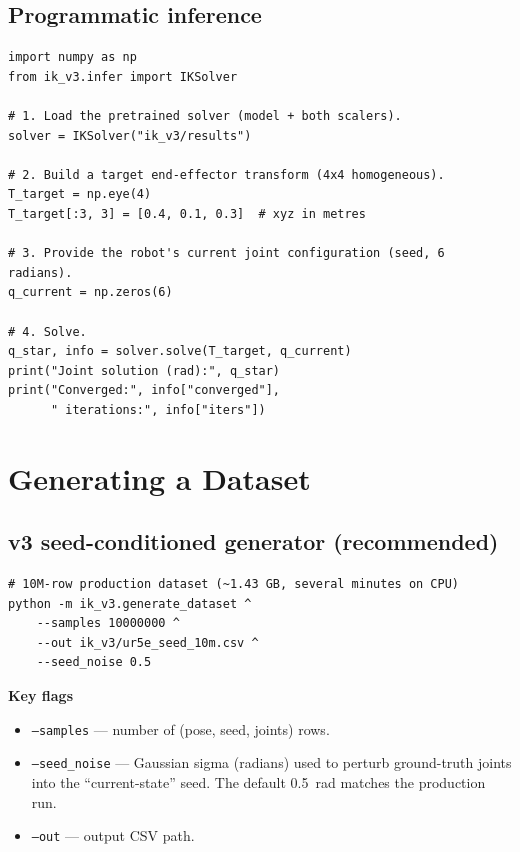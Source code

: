 \documentclass[11pt]{article}
\begin{document}
\subsection{Programmatic inference}

\begin{lstlisting}[style=py]
import numpy as np
from ik_v3.infer import IKSolver

# 1. Load the pretrained solver (model + both scalers).
solver = IKSolver("ik_v3/results")

# 2. Build a target end-effector transform (4x4 homogeneous).
T_target = np.eye(4)
T_target[:3, 3] = [0.4, 0.1, 0.3]  # xyz in metres

# 3. Provide the robot's current joint configuration (seed, 6 radians).
q_current = np.zeros(6)

# 4. Solve.
q_star, info = solver.solve(T_target, q_current)
print("Joint solution (rad):", q_star)
print("Converged:", info["converged"],
      " iterations:", info["iters"])
\end{lstlisting}

\section{Generating a Dataset}

\subsection{v3 seed-conditioned generator (recommended)}

\begin{lstlisting}[style=shell]
# 10M-row production dataset (~1.43 GB, several minutes on CPU)
python -m ik_v3.generate_dataset ^
    --samples 10000000 ^
    --out ik_v3/ur5e_seed_10m.csv ^
    --seed_noise 0.5
\end{lstlisting}

\noindent\textbf{Key flags}
\begin{itemize}[leftmargin=*]
    \item \texttt{--samples} --- number of (pose, seed, joints) rows.
    \item \texttt{--seed\_noise} --- Gaussian sigma (radians) used to
          perturb ground-truth joints into the ``current-state'' seed.
          The default 0.5~rad matches the production run.
    \item \texttt{--out} --- output CSV path.
\end{itemize}
\end{document}
